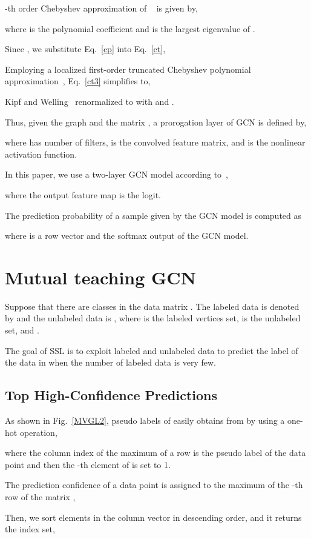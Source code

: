 \documentclass{article}
\begin{document}
-th order Chebyshev approximation of ~\cite{hammond2011wavelets} is given by,

where  is the polynomial coefficient and  is the largest eigenvalue of .

Since , we substitute Eq.~\eqref{cp} into Eq.~\eqref{ct},



Employing a localized first-order truncated Chebyshev polynomial approximation~\cite{defferrard2016convolutional,kipf2016semi}, Eq.~\eqref{ct3} simplifies to,


Kipf and Welling~\cite{kipf2016semi} renormalized  to  with  and .

Thus, given the graph  and the matrix , a prorogation layer of GCN is defined by,

where  has  number of filters,  is the convolved feature matrix, and  is the nonlinear activation function.

In this paper, we use a two-layer GCN model according to~\cite{kipf2016semi},

where the output feature map  is the logit.

The prediction probability of a sample  given by the GCN model is computed as

where  is a row vector and the {\rm softmax} output of the GCN model.
\section{Mutual teaching GCN}\label{sec_MLGCN}
Suppose that there are  classes in the data matrix . The labeled data is denoted by  and the unlabeled data is , where  is the labeled vertices set,  is the unlabeled set, and .

The goal of SSL is to exploit labeled and unlabeled data to predict the label of the data in  when the number of labeled data is very few.
\subsection{Top  High-Confidence Predictions}\label{topt}
As shown in Fig.~\ref{MVGL2}, pseudo labels  of  easily obtains from  by using a one-hot operation,

where the column index  of the maximum of a row  is the pseudo label of the data point  and then the -th element of  is set to 1.

The prediction confidence  of a data point  is assigned to the maximum of the -th row  of the matrix ,


Then, we sort elements in the column vector  in descending order, and it returns the index set,
\end{document}
